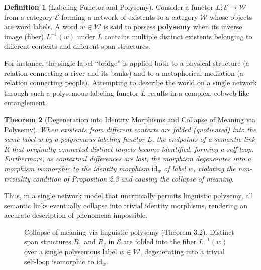 \documentclass[11pt,a4paper]{article}
\theoremstyle{definition}
\newtheorem{definition}{Definition}[section]
\theoremstyle{plain}
\newtheorem{theorem}[definition]{Theorem}
\begin{document}
\begin{definition}[Labeling Functor and Polysemy]
Consider a functor $L: \mathcal{E} \to \mathcal{W}$ from a category $\mathcal{E}$ forming a network of existents to a category $\mathcal{W}$ whose objects are word labels. A word $w \in \mathcal{W}$ is said to possess \textbf{polysemy} when its inverse image (fiber) $L^{-1}(w)$ under $L$ contains multiple distinct existents belonging to different contexts and different span structures.
\end{definition}

For instance, the single label ``bridge'' is applied both to a physical structure (a relation connecting a river and its banks) and to a metaphorical mediation (a relation connecting people). Attempting to describe the world on a single network through such a polysemous labeling functor $L$ results in a complex, cobweb-like entanglement.

\begin{theorem}[Degeneration into Identity Morphisms and Collapse of Meaning via Polysemy]
When existents from different contexts are folded (quotiented) into the same label $w$ by a polysemous labeling functor $L$, the endpoints of a semantic link $R$ that originally connected distinct targets become identified, forming a self-loop. Furthermore, as contextual differences are lost, the morphism degenerates into a morphism isomorphic to the identity morphism $\mathrm{id}_{w}$ of label $w$, violating the non-triviality condition of Proposition 2.3 and causing the collapse of meaning.
\end{theorem}

Thus, in a single network model that uncritically permits linguistic polysemy, all semantic links eventually collapse into trivial identity morphisms, rendering an accurate description of phenomena impossible.

\begin{figure}[htbp]
\centering
{}
\caption{Collapse of meaning via linguistic polysemy (Theorem 3.2). Distinct span structures $R_1$ and $R_2$ in $\mathcal{E}$ are folded into the fiber $L^{-1}(w)$ over a single polysemous label $w \in \mathcal{W}$, degenerating into a trivial self-loop isomorphic to $\mathrm{id}_w$.}
\label{fig:polysemy_collapse}
\end{figure}
\end{document}
